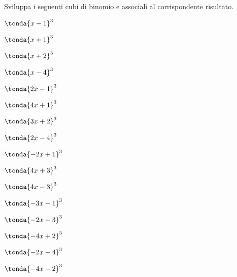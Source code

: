 \begin{esercizio}
\label{ese:11.26}
Sviluppa i seguenti cubi di binomio e associali al corrispondente 
risultato.
\begin{htmulticols}{4}
\begin{enumeratea}
\spazielenx
\item \(\tonda{x - 1}^{3}\) %
\item \(\tonda{x + 1}^{3}\) %
\item \(\tonda{x + 2}^{3}\) %
\item \(\tonda{x - 4}^{3}\) %
\item \(\tonda{2 x - 1}^{3}\) %
\item \(\tonda{4 x + 1}^{3}\) %
\item \(\tonda{3 x + 2}^{3}\) %
\item \(\tonda{2 x - 4}^{3}\) %
\item \(\tonda{- 2 x + 1}^{3}\) %
\item \(\tonda{4 x + 3}^{3}\) %
\item \(\tonda{4 x - 3}^{3}\) %
\item \(\tonda{- 3 x - 1}^{3}\) %
\item \(\tonda{- 2 x - 3}^{3}\) %
\item \(\tonda{- 4 x + 2}^{3}\) %
\item \(\tonda{- 2 x - 4}^{3}\) %
\item \(\tonda{- 4 x - 2}^{3}\) %

\end{enumeratea}
\end{htmulticols}
\end{esercizio}
